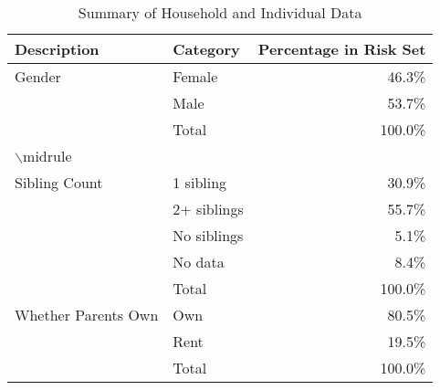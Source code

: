 \begin{table}[htpb]
\centering
\caption{Summary of Household and Individual Data} 
\label{HILDATab}
\begin{tabular}{llr}
  \toprule
\parbox[t]{0.3\textwidth}{\centering Description} & \parbox[t]{0.15\textwidth}{\centering Category} & \parbox[t]{0.15\textwidth}{\centering Percentage in Risk Set} \\ 
  \midrule
Gender & Female & 46.3\% \\ 
   & Male & 53.7\% \\ 
   & Total & 100.0\% \\ 
  $\backslash$midrule &  &  \\ 
  Sibling Count & 1 sibling & 30.9\% \\ 
   & 2+ siblings & 55.7\% \\ 
   & No siblings & 5.1\% \\ 
   & No data & 8.4\% \\ 
   & Total & 100.0\% \\ 
  Whether Parents Own & Own & 80.5\% \\ 
    & Rent & 19.5\% \\ 
    & Total & 100.0\% \\ 
   \bottomrule
\end{tabular}
\end{table}
